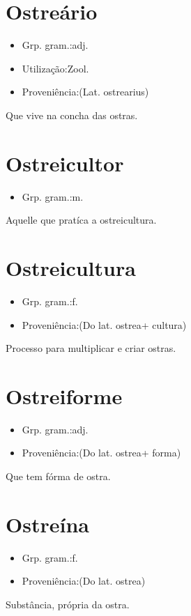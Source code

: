 \section{Ostreário}
\begin{itemize}
\item {Grp. gram.:adj.}
\end{itemize}
\begin{itemize}
\item {Utilização:Zool.}
\end{itemize}
\begin{itemize}
\item {Proveniência:(Lat. \textunderscore ostrearius\textunderscore )}
\end{itemize}
Que vive na concha das ostras.
\section{Ostreicultor}
\begin{itemize}
\item {Grp. gram.:m.}
\end{itemize}
Aquelle que pratíca a ostreicultura.
\section{Ostreicultura}
\begin{itemize}
\item {Grp. gram.:f.}
\end{itemize}
\begin{itemize}
\item {Proveniência:(Do lat. \textunderscore ostrea\textunderscore  + \textunderscore cultura\textunderscore )}
\end{itemize}
Processo para multiplicar e criar ostras.
\section{Ostreiforme}
\begin{itemize}
\item {Grp. gram.:adj.}
\end{itemize}
\begin{itemize}
\item {Proveniência:(Do lat. \textunderscore ostrea\textunderscore  + \textunderscore forma\textunderscore )}
\end{itemize}
Que tem fórma de ostra.
\section{Ostreína}
\begin{itemize}
\item {Grp. gram.:f.}
\end{itemize}
\begin{itemize}
\item {Proveniência:(Do lat. \textunderscore ostrea\textunderscore )}
\end{itemize}
Substância, própria da ostra.
